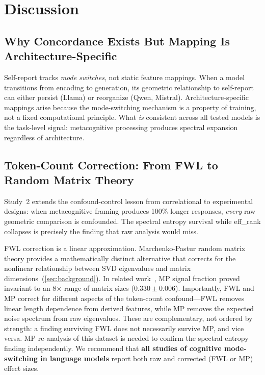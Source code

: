 \documentclass[11pt,a4paper]{article}
\begin{document}
\section{Discussion}

\subsection{Why Concordance Exists But Mapping Is Architecture-Specific}

Self-report tracks \emph{mode switches}, not static feature mappings. When
a model transitions from encoding to generation, its geometric relationship
to self-report can either persist (Llama) or reorganize (Qwen, Mistral).
Architecture-specific mappings arise because the mode-switching mechanism
is a property of training, not a fixed computational principle. What
\emph{is} consistent across all tested models is the task-level signal: metacognitive processing
produces spectral expansion regardless of architecture.

\subsection{Token-Count Correction: From FWL to Random Matrix Theory}

Study~2 extends the confound-control lesson from correlational to
experimental designs: when metacognitive framing produces 100\% longer
responses, \emph{every} raw geometric comparison is confounded. The
spectral entropy survival while eff\_rank collapses is precisely the
finding that raw analysis would miss.

FWL correction is a linear approximation. Marchenko-Pastur random matrix
theory provides a mathematically distinct alternative that corrects for
the nonlinear relationship between SVD eigenvalues and matrix
dimensions~(\cref{sec:background}). In related work~\citep{lyra2026oracle},
MP signal fraction proved invariant to an 8$\times$ range of matrix sizes
($0.330 \pm 0.006$). Importantly, FWL and MP correct for different
aspects of the token-count confound---FWL removes linear length
dependence from derived features, while MP removes the expected noise
spectrum from raw eigenvalues. These are complementary, not ordered by
strength: a finding surviving FWL does not necessarily survive MP, and
vice versa. MP re-analysis of this dataset is needed to confirm the
spectral entropy finding independently.
We recommend that \textbf{all studies of cognitive mode-switching in
language models} report both raw and corrected (FWL or MP) effect sizes.
\end{document}
